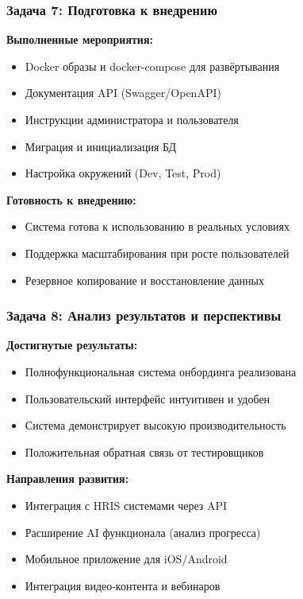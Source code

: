 \documentclass[aspectratio=43,11pt]{beamer}
\begin{document}
\begin{frame}
    \frametitle{Задача 7: Подготовка к внедрению}
    
    \textbf{Выполненные мероприятия:}
    \begin{itemize}
        \item Docker образы и docker-compose для развёртывания
        \item Документация API (Swagger/OpenAPI)
        \item Инструкции администратора и пользователя
        \item Миграция и инициализация БД
        \item Настройка окружений (Dev, Test, Prod)
    \end{itemize}
    
    \bigskip
    
    \textbf{Готовность к внедрению:}
    \begin{itemize}
        \item Система готова к использованию в реальных условиях
        \item Поддержка масштабирования при росте пользователей
        \item Резервное копирование и восстановление данных
    \end{itemize}
\end{frame}

\begin{frame}
    \frametitle{Задача 8: Анализ результатов и перспективы}
    
    \textbf{Достигнутые результаты:}
    \begin{itemize}
        \item Полнофункциональная система онбординга реализована
        \item Пользовательский интерфейс интуитивен и удобен
        \item Система демонстрирует высокую производительность
        \item Положительная обратная связь от тестировщиков
    \end{itemize}
    
    \bigskip
    
    \textbf{Направления развития:}
    \begin{itemize}
        \item Интеграция с HRIS системами через API
        \item Расширение AI функционала (анализ прогресса)
        \item Мобильное приложение для iOS/Android
        \item Интеграция видео-контента и вебинаров
    \end{itemize}
\end{frame}
\end{document}
